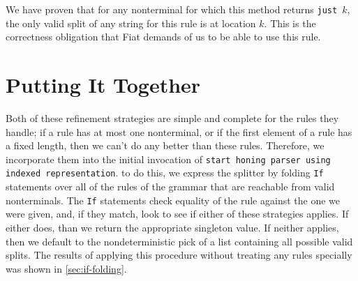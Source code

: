 
    We have proven that for any nonterminal for which this method returns \texttt{just }$k$, the only valid split of any string for this rule is at location $k$.  This is the correctness obligation that Fiat demands of us to be able to use this rule.

  \section{Putting It Together}\label{sec:first-mention-first-honing-step}
     Both of these refinement strategies are simple and complete for the rules they handle; if a rule has at most one nonterminal, or if the first element of a rule has a fixed length, then we can't do any better than these rules.  Therefore, we incorporate them into the initial invocation of \verb|start honing parser using indexed representation|.   to do this, we express the splitter by folding \verb|If| statements over all of the rules of the grammar that are reachable from valid nonterminals.  The \verb|If| statements check equality of the rule against the one we were given, and, if they match, look to see if either of these strategies applies.  If either does, than we return the appropriate singleton value.  If neither applies, then we default to the nondeterministic pick of a list containing all possible valid splits.  The results of applying this procedure without treating any rules specially was shown in \autoref{sec:if-folding}.  
     


